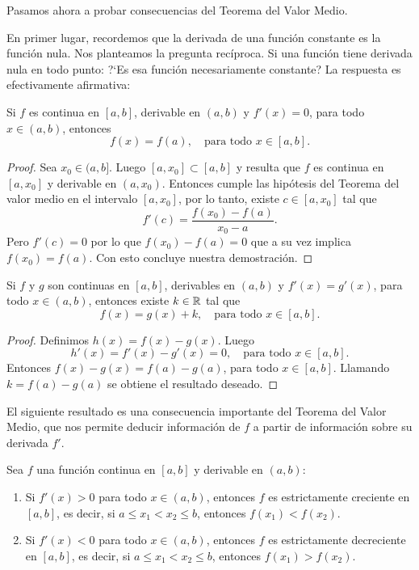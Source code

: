 Pasamos ahora a probar consecuencias del Teorema del Valor Medio.

En primer lugar, recordemos que la derivada de una función constante es la función nula.
Nos planteamos la pregunta recíproca. Si una función tiene derivada nula en todo punto: ?`Es esa función necesariamente constante?
La respuesta es efectivamente afirmativa:

\begin{proposition}
    Si $f$ es continua en $[a,b]$, derivable en $(a,b)$ y $f'(x)=0$, para todo $x\in(a,b)$, entonces %
    \[ 
    f(x)=f(a), \quad\text{para todo $x\in [a,b]$}.
    \]
\end{proposition}

\begin{proof}
    Sea $x_0 \in (a,b]$. Luego $[a,x_0]\subset [a,b]$ y resulta que $f$ es continua en $[a,x_0]$ y derivable en $(a,x_0)$. Entonces cumple las hipótesis del Teorema del valor medio en el intervalo $[a,x_0]$, por lo tanto, existe $c\in [a,x_0]$ tal que 
    \[
    f'(c) = \frac{f(x_0)-f(a)}{x_0-a}.
    \]
    Pero $f'(c)=0$ por lo que $f(x_0)-f(a)=0$ que a su vez implica $f(x_0)=f(a)$. Con esto concluye nuestra demostración.
\end{proof}

\begin{corollary}
    Si $f$ y $g$ son continuas en $[a,b]$, derivables en $(a,b)$ y $f'(x)=g'(x)$, para todo $x\in(a,b)$, entonces existe $k\in\mathbb{R}$ tal que 
    \[ 
    f(x)=g(x)+k, \quad\text{para todo $x\in [a,b]$}.
    \]
\end{corollary}

\begin{proof}
    Definimos $h(x)=f(x)-g(x)$. Luego 
    \[
    h'(x)=f'(x)-g'(x)=0, \quad\text{para todo $x\in [a,b]$}.
    \]
    Entonces $f(x)-g(x)=f(a)-g(a)$, para todo $x\in[a,b]$. 
    Llamando $k=f(a)-g(a)$ se obtiene el resultado deseado.
\end{proof}

El siguiente resultado es una consecuencia importante del Teorema del Valor Medio, que nos permite deducir información de $f$ a partir de información sobre su derivada $f'$.

\begin{proposition}\label{P:signo-derivada=>tendencia}
    Sea $f$ una función continua en $[a,b]$ y derivable en $(a,b)$:
    \begin{enumerate}
        \item Si $f'(x)>0$ para todo $x\in(a,b)$, entonces $f$ es estrictamente creciente en $[a,b]$, 
        es decir, si $a\le x_1<x_2\le b$, entonces $f(x_1)<f(x_2)$.
        \item Si $f'(x)<0$ para todo $x\in(a,b)$, entonces $f$ es estrictamente decreciente en $[a,b]$,
        es decir, si $a\le x_1<x_2\le b$, entonces $f(x_1)>f(x_2)$.
    \end{enumerate}
\end{proposition}

